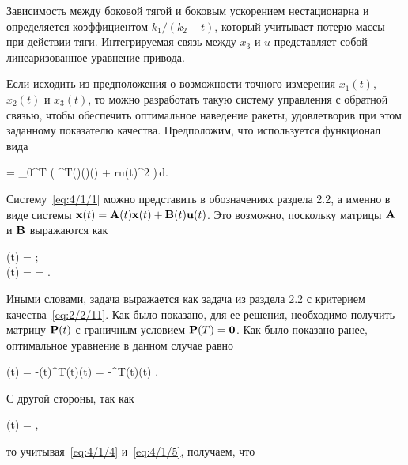 Зависимость между боковой тягой и боковым ускорением нестационарна и определяется коэффициентом $k_1 / (k_2 - t)$, который учитывает потерю массы при действии тяги. Интегрируемая связь между $x_3$ и $u$ представляет собой линеаризованное уравнение привода.


Если исходить из предположения о возможности точного измерения $x_1(t)$, $x_2(t)$ и $x_3(t)$, то можно разработать такую систему управления с обратной связью, чтобы обеспечить оптимальное наведение ракеты, удовлетворив при этом заданному показателю качества. Предположим, что используется функционал вида

	\funcF =  \int\limits_0^T \bigl( ^T(\tau)(\tau)(\tau) + ru(t)^2 \bigr)\,d\tau \mbox{.}
\eeq

Систему~\ref{eq:4/1/1} можно представить в обозначениях раздела 2.2, а именно в виде системы $\mathbf{x}(t) = \mathbf{A}(t)\mathbf{x}(t) + \mathbf{B}(t)\mathbf{u}(t)$. Это возможно, поскольку матрицы $\mathbf{A}$ и $\mathbf{B}$ выражаются как

\beqarr
		(t) =  \mbox{;} \\
		(t) =  =  \mbox{.}
\eeqarr

Иными словами, задача выражается как задача из раздела 2.2 с критерием качества~\vref{eq:2/2/11}. Как было показано, для ее решения, необходимо получить матрицу $\mathbf{P}(t)$ с граничным условием $\mathbf{P}(T) = \mathbf{0}$. Как было показано ранее, оптимальное уравнение в данном случае равно

	\optU(t) = -(t)^T(t)(t) = -^T(t)(t) \mbox{.}
\eeq

С другой стороны, так как

	(t) =  \mbox{,}
\eeq

то учитывая~\ref{eq:4/1/4} и~\ref{eq:4/1/5}, получаем, что

